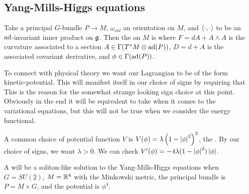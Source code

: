 \documentclass{article}
\begin{document}
\subsection{Yang-Mills-Higgs equations}
\begin{definition}
Take a principal $G$-bundle $P\to M$, $\omega_{vol}$ an orientation on $M$, and $\left\langle \cdot, \cdot \right\rangle$ to be an $\operatorname{ad}$-invariant inner product on $\mathfrak{g}$. Then the  on $M$ is 
where $F=dA+A\wedge A$ is the curvature associated to a section $A\in \Gamma(T^\ast M \otimes \operatorname{ad}(P))$, $D = d+A$ is the associated covariant derivative, and $\phi \in \Gamma(\operatorname{ad}(P))$.
\end{definition}

To connect with physical theory we want our Lagrangian to be of the form kinetic-potential. This will manifest itself in our choice of signs by requiring that 
This is the reason for the somewhat strange looking sign choice at this point. Obviously in the end it will be equivalent to take 
when it comes to the variational equations, but this will not be true when we consider the energy functional.
\begin{remark}
	A common choice of potential function $V$ is $V(\phi) = \lambda \left( 1-\left\lvert \phi \right\rvert^2 \right)^2$, the . By our choice of signs, we want $\lambda >0$. We can check $V^\prime(\phi) = -4\lambda(1-\left\lvert \phi \right\rvert^2)\left\lvert \phi \right\rvert$. 
\end{remark}

\begin{definition}
	A  will be a soliton-like solution to the Yang-Mills-Higgs equations when $G=SU(2)$, $M=\mathbb{R}^4$ with the Minkowski metric, the principal bundle is $P = M \times G$, and the potential is $\phi^4$. 
\end{definition}
\end{document}
